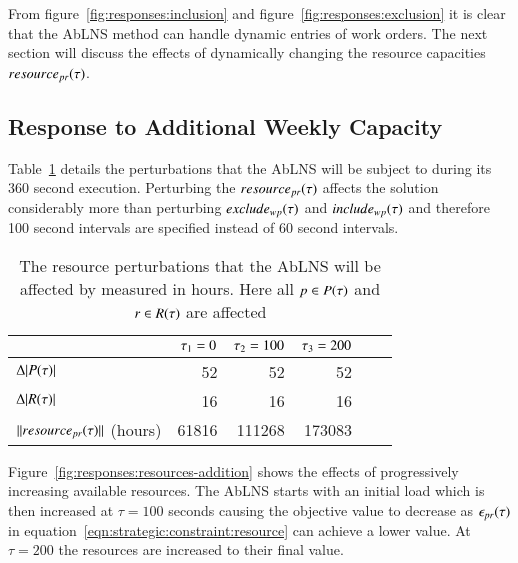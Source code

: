 From figure~\ref{fig:responses:inclusion} and figure~\ref{fig:responses:exclusion} it is 
clear that the AbLNS method can handle dynamic entries of work orders. The next section will discuss the effects of dynamically changing the 
resource capacities $\ParStrategicResource$. 

\subsection{Response to Additional Weekly Capacity}\label{sec:increase_week_cap}
Table~\ref{tab:responses:resource-addition} details the perturbations that the
AbLNS will be subject to during its 360 second execution. Perturbing the
$\ParStrategicResource$ affects the solution considerably more than
perturbing $exclude_{wp}(\tau)$ and $include_{wp}(\tau)$ and therefore 100
second intervals are specified instead of 60 second intervals.

\begin{table}[H]
	\centering
	\begin{tabular}{lrrrrr}
	\toprule
	                                     & $\tau_1 = 0$ & $\tau_2 = 100$ & $\tau_3 = 200$   \\ \midrule
	$\Delta |P(\tau)|$                & 52                     & 52                     & 52                     \\ \midrule
	$\Delta |R(\tau)|$              & 16                     & 16                     & 16                     \\ \midrule
	$ ||resource_{pr}(\tau)||$ (hours) &  61816                 & 111268                 & 173083                 \\ \bottomrule
	\end{tabular}
	\caption{The resource perturbations that the AbLNS will be affected by measured in hours.
		Here all $p \in P(\tau)$ and $r \in R(\tau)$ are 
		affected
	}\label{tab:responses:resource-addition}
\end{table}

Figure~\ref{fig:responses:resources-addition} shows the effects of progressively
increasing  available resources. The AbLNS starts with an initial load which is
then increased at $\tau = 100$ seconds causing the objective value to decrease
as $\epsilon_{pr}(\tau)$ in equation~\ref{eqn:strategic:constraint:resource}
can achieve a lower value. At $\tau = 200$ the resources are increased
to their final value.

